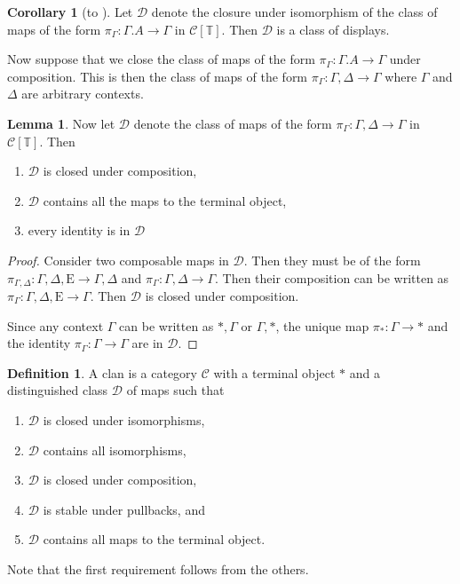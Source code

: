 \documentclass{article}
\theoremstyle{definition}
\newtheorem{definition}{Definition}[section]
\theoremstyle{theorem}
\newtheorem{lemma}{Lemma}[section]
\newtheorem{corollary}{Corollary}[section]
\newcommand{\T}{\mathbb T}
\newcommand{\C}{\mathcal C}
\newcommand{\D}{\mathcal D}
\newcommand{\syncat}[1]{\C [#1]}
\newcommand{\Epsilon}{\mathrm E}
\begin{document}
\begin{corollary}[to ]
    Let $\D$ denote the closure under isomorphism of the class of maps of the form $\pi_\Gamma : \Gamma.A \to \Gamma$ in $\syncat{\T}$. Then $\D$ is a class of displays.
\end{corollary}

Now suppose that we close the class of maps of the form $\pi_\Gamma : \Gamma.A \to \Gamma$ under composition. This is then the class of maps of the form $\pi_\Gamma : \Gamma, \Delta \to \Gamma$ where $\Gamma$ and $\Delta$ are arbitrary contexts.

\begin{lemma}\label{lem:syn-clan}
    Now let $\D$ denote the class of maps of the form $\pi_\Gamma : \Gamma, \Delta \to \Gamma$ in $\syncat{\T}$. Then
    \begin{enumerate}
        \item $\D$ is closed under composition,
        \item $\D$ contains all the maps to the terminal object,
        \item every identity is in $\D$
    \end{enumerate} 
\end{lemma}
\begin{proof}
    Consider two composable maps in $\D$. Then they must be of the form $\pi_{\Gamma, \Delta}: \Gamma, \Delta, \Epsilon \to \Gamma, \Delta$ and $\pi_\Gamma : \Gamma, \Delta \to \Gamma$. Then their composition can be written as $\pi_\Gamma : \Gamma, \Delta, \Epsilon \to \Gamma$. Then $\D$ is closed under composition.

    Since any context $\Gamma$ can be written as $*, \Gamma$ or $\Gamma, *$, the unique map $\pi_* : \Gamma \to *$ and the identity $\pi_\Gamma : \Gamma \to \Gamma$
    are in $\D$.
\end{proof}

\begin{definition}
    A clan \cite{joyal} is a category $\C$ with a terminal object $*$ and a distinguished class $\D$ of maps such that
    \begin{enumerate}
        \item $\D$ is closed under isomorphisms,
        \item $\D$ contains all isomorphisms,
        \item $\D$ is closed under composition,
        \item $\D$ is stable under pullbacks, and
        \item $\D$ contains all maps to the terminal object.
    \end{enumerate}
    Note that the first requirement follows from the others.
\end{definition}
\end{document}
